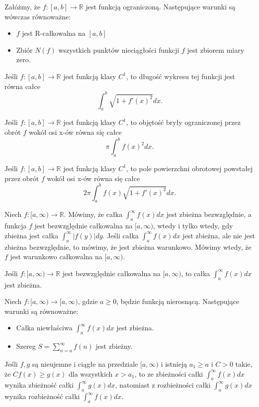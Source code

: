 \documentclass[12pt]{article}
\newcommand{\R}{\mathbb{R}}
\begin{document}
\theorem{}
Załóżmy, że $f : [a, b] \rightarrow \R$ jest funkcją ograniczoną. Następujące warunki są wówczas równoważne:
\begin{itemize}
    \item $f$ jest R-całkowalna na $[a, b]$
    \item Zbiór $N(f)$ wszystkich punktów nieciągłości funkcji $f$ jest zbiorem miary zero.
\end{itemize}

Jeśli $f : [a, b] \rightarrow \R$ jest funkcją klasy $C^1$, to długość wykresu tej funkcji jest
równa całce
$$ \int_a^b \sqrt{1 + f'(x)^2} dx.$$

Jeśli $f : [a, b] \rightarrow \R$ jest funkcją klasy $C^1$, to objętość bryły ograniczonej przez obrót $f$ wokół osi x-ów równa się całce
$$ \pi \int_a^b f(x)^2 dx.$$

Jeśli $f : [a, b] \rightarrow \R$ jest funkcją klasy $C^1$, to pole powierzchni obrotowej powstałej przez obrót $f$ wokół osi x-ów równa się całce
$$ 2\pi \int_a^b f(x) \sqrt{1 + f'(x)^2} dx.$$

Niech $f : [a, \infty) \rightarrow \R$. Mówimy, że całka
$\int_a^\infty f(x) dx$ jest zbieżna bezwzględnie, a funkcja $f$ jest
bezwzględnie całkowalna na $[a, \infty)$, wtedy i tylko wtedy, gdy zbieżna jest całka
$\int_a^\infty |f(y)| dy$.
Jeśli całka 
$\int_a^\infty f(x) dx$ jest zbieżna, ale nie jest zbieżna bezwzględnie, to mówimy, że jest
zbieżna warunkowo. Mówimy wtedy, że $f$ jest warunkowo całkowalna na $[a, \infty)$.

\theorem{}
Jeśli $f : [a, \infty) \rightarrow \R$ jest bezwzględnie całkowalna na $[a, \infty)$, to całka
$\int_a^\infty f(x) dx$ jest zbieżna.

\theorem{}
Niech $f : [a, \infty) \rightarrow [a, \infty)$, gdzie $a \geq 0$, będzie funkcją nierosnącą.
Następujące warunki są równoważne:
\begin{itemize}
    \item Całka niewłaściwa $\int_a^\infty f(x) dx$ jest zbieżna.
    \item Szereg $S = \sum_{n=a}^\infty f(n)$ jest zbieżny.
\end{itemize}

Jeśli $f, g$ są nieujemne i ciągłe na przedziale $[a, \infty)$ i istnieją $a_1 \geq a$ i $C > 0$ takie, że $Cf(x) \geq g(x)$ dla wszystkich $x > a_1$, to ze zbieżności całki 
$\int_a^\infty f(x) dx$ wynika zbieżność całki $\int_a^\infty g(x) dx$,
natomiast z rozbieżności całki
$\int_a^\infty g(x) dx$ wynika rozbieżność całki $\int_a^\infty f(x) dx$.
\end{document}
